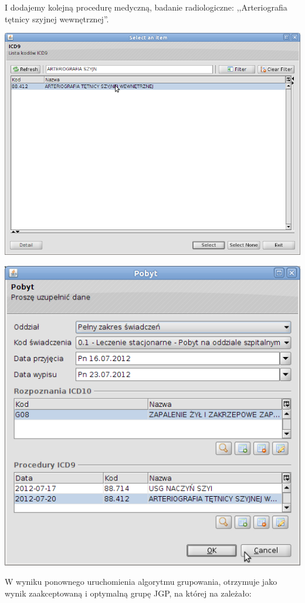 I dodajemy kolejną procedurę medyczną, badanie radiologiczne: ,,Arteriografia tętnicy szyjnej wewnętrznej''.

\includegraphics[scale=0.4]{images/gruper13}

\includegraphics[scale=0.4]{images/gruper14}

W wyniku ponownego uruchomienia algorytmu grupowania, otrzymuje jako wynik zaakceptowaną i optymalną grupę JGP, na której na zależało:

